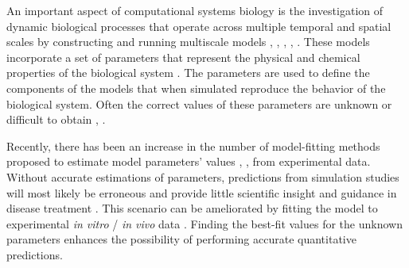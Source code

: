 

An important aspect of computational systems biology is the investigation of dynamic biological processes that operate across multiple temporal and spatial scales by constructing and running multiscale models \cite{Kang2014Biocellion}, \cite{qanitabaker:Materi2007Computational}, \cite{qanitabaker:DiazOchoa2012Multiscale}, \cite{qanitabaker:Castiglione2014Modeling}, \cite{Vicini2010Multiscale}. These models incorporate a set of parameters that represent the physical and chemical properties of the biological system \cite{qanitabaker:Mahoney2012Multiobjective}. The parameters are used to define the components of the models that when simulated reproduce the behavior of the biological system. Often the correct values of these parameters are unknown or difficult to obtain \cite{qanitabaker:Walker2007Challenges}, \cite{qanitabaker:Transtrum2009Why}.

Recently, there has been an increase in the number of model-fitting methods proposed to estimate model parameters' values \cite{qanitabaker:RodriguezFernandez2006Novel}, \cite{qanitabaker:Chou2009Recent}, \cite{qanitabaker:Sun2012Parameter} from experimental data.  Without accurate estimations of parameters, predictions from simulation studies will most likely be erroneous and provide little scientific insight and guidance in disease treatment  \cite{qanitabaker:Banga2008Optimization}. This scenario can be ameliorated by fitting the model to experimental \textit{in vitro} / \textit{in vivo} data \cite{qanitabaker:BalsaCanto2008Hybrid} \cite{qanitabaker:Lillacci2010Parameter}. Finding the best-fit values for the unknown parameters enhances the possibility of performing accurate quantitative predictions.

